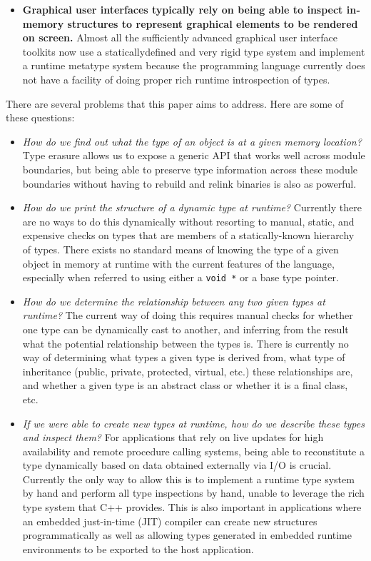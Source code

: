 \begin{itemize}
\item \textbf{Graphical user interfaces typically rely on being able to inspect
in­memory structures to represent graphical elements to be rendered on screen.}
Almost all the sufficiently advanced graphical user interface toolkits now use a
statically­defined and very rigid type system and implement a runtime meta­type
system because the programming language currently does not have a facility of
doing proper rich runtime introspection of types.
\end{itemize}

There are several problems that this paper aims to address. Here are some of
these questions:

\begin{itemize}
\item \emph{How do we find out what the type of an object is at a given memory
location?}  Type erasure allows us to expose a generic API that works well
across module boundaries, but being able to preserve type information across
these module boundaries without having to rebuild and relink binaries is also as
powerful.

\item \emph{How do we print the structure of a dynamic type at runtime?}
Currently there are no ways to do this dynamically without resorting to manual,
static, and expensive checks on types that are members of a statically-known
hierarchy of types. There exists no standard means of knowing the type of a
given object in memory at runtime with the current features of the language,
especially when referred to using either a \verb+void *+ or a base type pointer.

\item \emph{How do we determine the relationship between any two given types at
runtime?} The current way of doing this requires manual checks for whether one
type can be dynamically cast to another, and inferring from the result what the
potential relationship between the types is. There is currently no way of
determining what types a given type is derived from, what type of inheritance
(public, private, protected, virtual, etc.) these relationships are, and whether
a given type is an abstract class or whether it is a final class, etc.

\item \emph{If we were able to create new types at runtime, how do we describe
these types and inspect them?} For applications that rely on live updates for
high availability and remote procedure calling systems, being able to
reconstitute a type dynamically based on data obtained externally via I/O is
crucial. Currently the only way to allow this is to implement a runtime type
system by hand and perform all type inspections by hand, unable to leverage the
rich type system that C++ provides. This is also important in applications where
an embedded just-in-time (JIT) compiler can create new structures
programmatically as well as allowing types generated in embedded runtime
environments to be exported to the host application.
\end{itemize}



